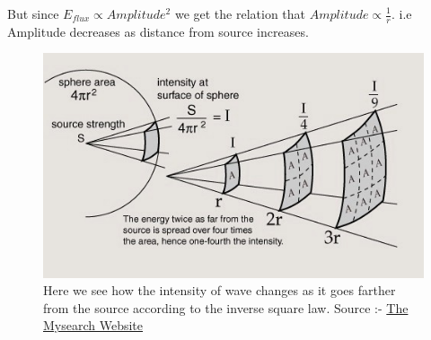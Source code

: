 \noindent But since $E_{flux} \propto Amplitude^2$ we get the relation that $Amplitude \propto \frac{1}{r}$. i.e Amplitude decreases as distance from source increases. 

\begin{figure}[h]
    \centering
    \includegraphics[scale=1.05]{images.tex/inverse_square.jpeg}
    \caption{ Here we see how the intensity of wave changes as it goes farther from the source according to the inverse square law. Source :- \href{http://www.mysearch.org.uk/website1/html/339.Laws.html}{The Mysearch Website}}
\end{figure}


\pagebreak

